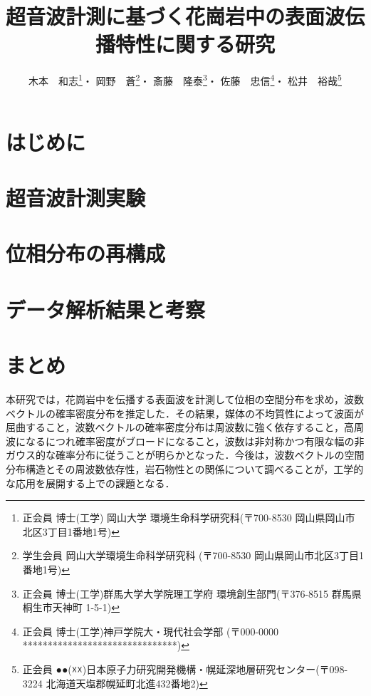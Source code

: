 \documentclass{jsce}
\title{
	超音波計測に基づく花崗岩中の表面波伝播特性に関する研究
}%
\author{木本　和志\thanks{正会員 博士(工学) 岡山大学 環境生命科学研究科(〒700-8530 岡山県岡山市北区3丁目1番地1号)\email{kimoto@cc.okayama-u.ac.jp}}・
岡野　蒼\thanks{学生会員 岡山大学環境生命科学研究科 (〒700-8530 岡山県岡山市北区3丁目1番地1号)}・
斎藤　隆泰\thanks{正会員 博士(工学)群馬大学大学院理工学府 環境創生部門(〒376-8515 群馬県桐生市天神町 1-5-1)}・
佐藤　忠信\thanks{正会員 博士(工学)神戸学院大・現代社会学部 (〒000-0000 *******************************)}・
松井　裕哉\thanks{正会員 ●●(☓☓)日本原子力研究開発機構・幌延深地層研究センター(〒098-3224 北海道天塩郡幌延町北進432番地2)}
}
\begin{document}
\maketitle
\section{はじめに}
	
	\vspace{-2mm}
\section{超音波計測実験}
	
\section{位相分布の再構成}
%	
\section{データ解析結果と考察}
%	
\section{まとめ}
本研究では，花崗岩中を伝播する表面波を計測して位相の空間分布を求め，波数ベクトルの確率密度分布を推定した．その結果，媒体の不均質性によって波面が屈曲すること，波数ベクトルの確率密度分布は周波数に強く依存すること，高周波になるにつれ確率密度がブロードになること，波数は非対称かつ有限な幅の非ガウス的な確率分布に従うことが明らかとなった．今後は，波数ベクトルの空間分布構造とその周波数依存性，岩石物性との関係について調べることが，工学的な応用を展開する上での課題となる．
\end{document}
